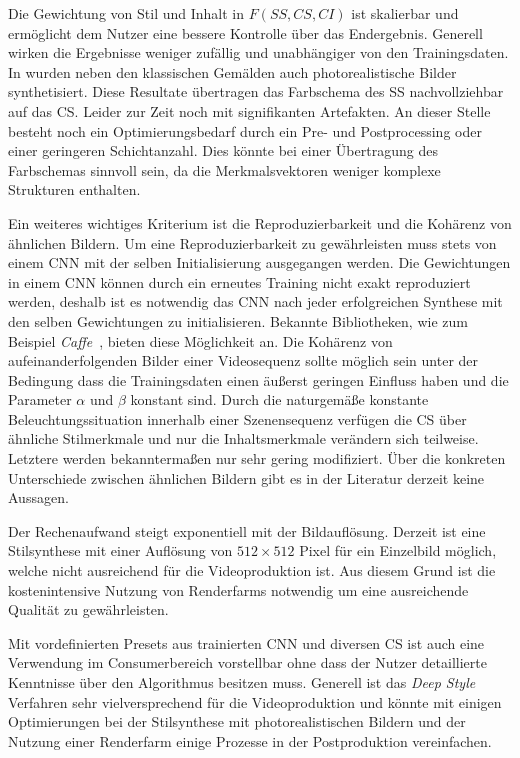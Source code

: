 \documentclass[times, 11pt,twocolumn]{article}
\begin{document}
Die Gewichtung von Stil und Inhalt in $F (SS,CS,CI)$ ist skalierbar und ermöglicht dem Nutzer eine bessere Kontrolle über das Endergebnis. Generell wirken die Ergebnisse weniger zufällig und unabhängiger von den Trainingsdaten. In \cite{McCaigDG16} wurden neben den klassischen Gemälden auch photorealistische Bilder synthetisiert. Diese Resultate übertragen das Farbschema des SS nachvollziehbar auf das CS. Leider zur Zeit noch mit signifikanten Artefakten. An dieser Stelle besteht noch ein Optimierungsbedarf durch ein Pre- und Postprocessing oder einer geringeren Schichtanzahl. Dies könnte bei einer Übertragung des Farbschemas sinnvoll sein, da die Merkmalsvektoren weniger komplexe Strukturen enthalten.

Ein weiteres wichtiges Kriterium ist die Reproduzierbarkeit und die Kohärenz von ähnlichen Bildern. Um eine Reproduzierbarkeit zu gewährleisten muss stets von einem CNN mit der selben Initialisierung ausgegangen werden. Die Gewichtungen in einem CNN können durch ein erneutes Training nicht exakt reproduziert werden, deshalb ist es notwendig das CNN nach jeder erfolgreichen Synthese mit den selben Gewichtungen zu initialisieren. Bekannte Bibliotheken, wie zum Beispiel \textit{Caffe}~\cite{JiaCaffe}, bieten diese Möglichkeit an.
Die Kohärenz von aufeinanderfolgenden Bilder einer Videosequenz sollte möglich sein unter der Bedingung dass die Trainingsdaten einen äußerst geringen Einfluss haben und die Parameter $\alpha$ und $\beta$ konstant sind. Durch die naturgemäße konstante Beleuchtungssituation innerhalb einer Szenensequenz verfügen die CS über ähnliche Stilmerkmale und nur die Inhaltsmerkmale verändern sich teilweise. Letztere werden bekanntermaßen nur sehr gering modifiziert. Über die konkreten Unterschiede zwischen ähnlichen Bildern gibt es in der Literatur derzeit keine Aussagen.

Der Rechenaufwand steigt exponentiell mit der Bildauflösung. Derzeit ist eine Stilsynthese mit einer Auflösung von $512\times512$ Pixel für ein Einzelbild möglich, welche nicht ausreichend für die Videoproduktion ist. Aus diesem Grund ist die kostenintensive Nutzung von Renderfarms notwendig um eine ausreichende Qualität zu gewährleisten.

Mit vordefinierten Presets aus trainierten CNN und diversen CS ist auch eine Verwendung im Consumerbereich vorstellbar ohne dass der Nutzer detaillierte Kenntnisse über den Algorithmus besitzen muss. Generell ist das \textit{Deep Style} Verfahren sehr vielversprechend für die Videoproduktion und könnte mit einigen Optimierungen bei der Stilsynthese mit photorealistischen Bildern und der Nutzung einer Renderfarm einige Prozesse in der Postproduktion vereinfachen. 
\end{document}
